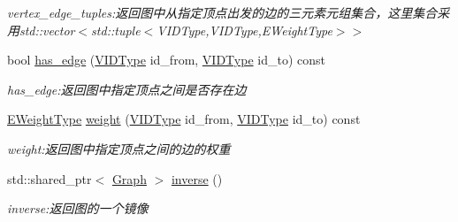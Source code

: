 \begin{DoxyCompactItemize}
\begin{DoxyCompactList}\small\item\em vertex\+\_\+edge\+\_\+tuples\+:返回图中从指定顶点出发的边的三元素元组集合，这里集合采用{\ttfamily std\+::vector$<$std\+::tuple$<$V\+I\+D\+Type,V\+I\+D\+Type,E\+Weight\+Type$>$$>$} \end{DoxyCompactList}\item 
bool \hyperlink{struct_introduction_to_algorithm_1_1_graph_algorithm_1_1_graph_ac6f3559ac73a84a45285d2906b9f7557}{has\+\_\+edge} (\hyperlink{struct_introduction_to_algorithm_1_1_graph_algorithm_1_1_graph_a507632614d13e91d29acbf8acb0b0f0f}{V\+I\+D\+Type} id\+\_\+from, \hyperlink{struct_introduction_to_algorithm_1_1_graph_algorithm_1_1_graph_a507632614d13e91d29acbf8acb0b0f0f}{V\+I\+D\+Type} id\+\_\+to) const 
\begin{DoxyCompactList}\small\item\em has\+\_\+edge\+:返回图中指定顶点之间是否存在边 \end{DoxyCompactList}\item 
\hyperlink{struct_introduction_to_algorithm_1_1_graph_algorithm_1_1_graph_a77f6d3ef31203e0d6ebd2ed87928978a}{E\+Weight\+Type} \hyperlink{struct_introduction_to_algorithm_1_1_graph_algorithm_1_1_graph_a9736f238bdedf0d6fccc064e6acea65d}{weight} (\hyperlink{struct_introduction_to_algorithm_1_1_graph_algorithm_1_1_graph_a507632614d13e91d29acbf8acb0b0f0f}{V\+I\+D\+Type} id\+\_\+from, \hyperlink{struct_introduction_to_algorithm_1_1_graph_algorithm_1_1_graph_a507632614d13e91d29acbf8acb0b0f0f}{V\+I\+D\+Type} id\+\_\+to) const 
\begin{DoxyCompactList}\small\item\em weight\+:返回图中指定顶点之间的边的权重 \end{DoxyCompactList}\item 
std\+::shared\+\_\+ptr$<$ \hyperlink{struct_introduction_to_algorithm_1_1_graph_algorithm_1_1_graph}{Graph} $>$ \hyperlink{struct_introduction_to_algorithm_1_1_graph_algorithm_1_1_graph_aec06e55b6164700f65dcc08dafe79666}{inverse} ()
\begin{DoxyCompactList}\small\item\em inverse\+:返回图的一个镜像 \end{DoxyCompactList}\end{DoxyCompactItemize}
